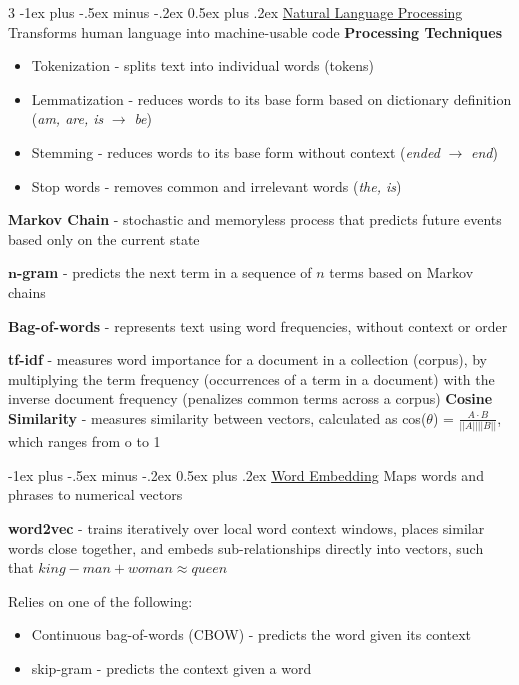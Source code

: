 \documentclass[10pt,landscape,letterpaper]{article}
\makeatletter
\renewcommand{\section}{\@startsection{section}{1}{0mm}%
                                {-1ex plus -.5ex minus -.2ex}%
                                {0.5ex plus .2ex}%
                                {\normalfont\large\bfseries}}
\renewcommand{\subsection}{\@startsection{subsection}{2}{0mm}%
                                {-1ex plus -.5ex minus -.2ex}%
                                {0.5ex plus .2ex}%
                                {\normalfont\normalsize\bfseries}}
\makeatother
\begin{document}
\begin{multicols}{3}
\section{\href{https://migue-rc.github.io/Data-Science-Cheatsheet/\#natural-language-processing}{Natural Language Processing}}
Transforms human language into machine-usable code
\textbf{Processing Techniques}
\begin{itemize}[label={--},leftmargin=4mm]
\itemsep -.4mm
\item Tokenization - splits text into individual words (tokens)
\item Lemmatization - reduces words to its base form based on dictionary definition (\emph{am, are, is} $\to$ \emph{be})
\item Stemming - reduces words to its base form without context (\emph{ended} $\to$ \emph{end})
\item Stop words - removes common and irrelevant words (\emph{the, is})
\end{itemize}

\textbf{Markov Chain} - stochastic and memoryless process that predicts future events based only on the current state

$\boldsymbol{n}$\textbf{-gram} - predicts the next term in a sequence of $n$ terms based on Markov chains

\textbf{Bag-of-words} - represents text using word frequencies, without context or order

\textbf{tf-idf} - measures word importance for a document in a collection (corpus), by multiplying the term frequency (occurrences of a term in a document) with the inverse document frequency (penalizes common terms across a corpus)
\textbf{Cosine Similarity} - measures similarity between vectors, calculated as cos($\theta$) =
$\frac{A\cdot B}{||A||||B||} $, which ranges from o to 1

\subsection{\href{https://migue-rc.github.io/Data-Science-Cheatsheet/\#word-embedding}{Word Embedding}}
Maps words and phrases to numerical vectors

\textbf{word2vec} - trains iteratively over local  word context windows, places similar words close together, and embeds sub-relationships directly into vectors, such that $king - man + woman \approx queen$

Relies on one of the following:
\begin{itemize}[label={--},leftmargin=4mm]
\itemsep -.4mm
\item Continuous bag-of-words (CBOW) - predicts the word given its context
\item skip-gram - predicts the context given a word
\end{itemize}


\end{multicols}
\end{document}
